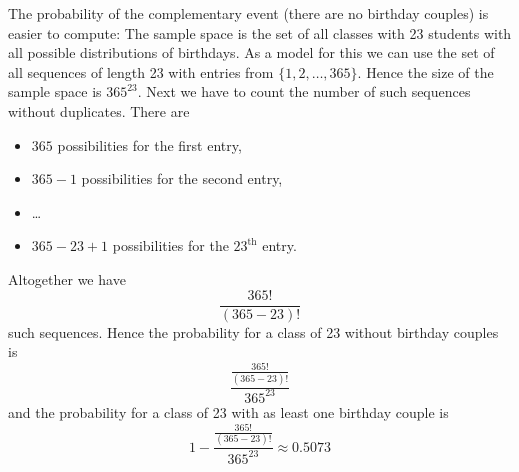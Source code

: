 \documentclass[twoside,11pt,a4paper]{article}
\newif\ifEN \ENtrue	                %
\def\tr|#1|#2|{\ifEN #2\else #1\fi}     %
\theoremstyle{definition}
\def\answerline#1{%
   \ifhmode\\[1ex]\fcolorbox{solbox}{solbox}{\hbox to \linewidth{\vbox to #1\baselineskip{}}}%
   \else\fcolorbox{solbox}{solbox}{\hbox to \linewidth{\vbox to #1\baselineskip{}}}%
   \fi
 }
\begin{document}
\begin{xxwrap}
\begin{Answer}
  \tr|Es ist einfacher die Wahrscheinlichkeit des Gegenereignisses (es gibt keine Geburtstagspärchen)
   zu berechnen: Der Ereignisraum ist die Menge aller Klassen der Grösse 23 mit allen möglichen Geburtstagsverteilungen.
   Als Modell dafür können wir die Menge aller Folgen der Länge 23 mit Einträgen in $\{1,2,\ldots, 365\}$ verwenden. Diese Menge hat  \(365^{23} \) Elemente. 
   Als nächstes müssen wir die Anzahl solcher Folgen berechnen, die keine Duplikate haben: Es gibt
  |The probability of the complementary event (there are no  birthday couples)
  is easier to compute: The sample space is the set of all classes with 23 students with all
  possible distributions of birthdays. As a model for this we can use the set of all sequences
  of length 23 with entries from $\{1,2,\ldots, 365\}$. Hence the size of the sample space is \(365^{23} \).
  Next we have to count the number of such sequences without duplicates. There are
 |
  \begin{itemize}
  \item $365$ \tr|Möglichkeiten für den ersten Eintrag,|possibilities for the first entry,|
  \item $365-1$ \tr|Möglichkeiten für den zweiten Eintrag,|possibilities for the second entry,|
  \item \ldots
  \item $365-23+1$ \tr|Möglichkeiten für den 23.ten Eintrag.|possibilities for the $23^{\text{th}}$ entry.|
  \end{itemize}
  \tr|Insgesamt gibt es |Altogether we have |
  \[
    \frac{365!}{(365-23)!}
  \]
  \tr|solche Folgen. Die Wahrscheinlichkeit für eine 23-er Klasse ohne Geburtstagspärchenist also |such sequences. Hence the probability for a class of 23 without birthday couples is|
  \[
    \frac{\frac{365!}{(365-23)!}}{365^{23}}
  \]
  \tr|und die Wahrscheinlichkeit für eine 23-er Klasse mit mindestens einem Geburtstagspärchen ist |and the probability for a class of 23 with as least one birthday couple is|
  \[
  1-  \frac{\frac{365!}{(365-23)!}}{365^{23}}\approx 0.5073
  \]
\end{Answer}
\answerline{12}
\end{xxwrap}
\end{document}
